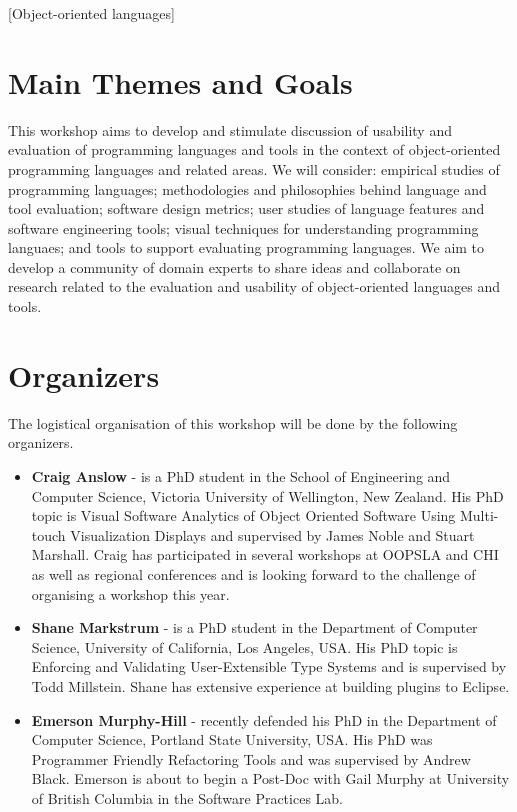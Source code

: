 \documentclass{acm_proc_article-sp}
\begin{document}
[Object-oriented languages]



\section{Main Themes and Goals}

This workshop aims to develop and stimulate discussion of usability and evaluation of programming languages and tools in the context of object-oriented programming languages and related areas. 
We will consider: empirical studies of programming languages; methodologies and philosophies behind language and tool evaluation; software design metrics; user studies of language features and software engineering tools; visual techniques for understanding programming languaes; and tools to support evaluating programming languages. 
We aim to develop a community of domain experts to share ideas and collaborate on research related to the evaluation and usability of object-oriented languages and tools. 

\section{Organizers}

The logistical organisation of this workshop will be done by the following organizers.

\begin{itemize}
\item \textbf{Craig Anslow} - is a PhD student in the School of Engineering and Computer Science, Victoria University of Wellington, New Zealand. His PhD topic is Visual Software Analytics of Object Oriented Software Using Multi-touch Visualization Displays and supervised by James Noble and Stuart Marshall. Craig has participated in several workshops at OOPSLA and CHI as well as regional conferences and is looking forward to the challenge of organising a workshop this year. 

\item \textbf{Shane Markstrum} - is a PhD student in the Department of Computer Science, University of California, Los Angeles, USA. His PhD topic is Enforcing and Validating User-Extensible Type Systems and is supervised by Todd Millstein. Shane has extensive experience at building plugins to Eclipse.

\item \textbf{Emerson Murphy-Hill} - recently defended his PhD in the Department of Computer Science, Portland State University, USA. His PhD was Programmer Friendly Refactoring Tools and was supervised by Andrew Black. Emerson is about to begin a Post-Doc with Gail Murphy at University of British Columbia in the Software Practices Lab.
\end{itemize}
\end{document}
